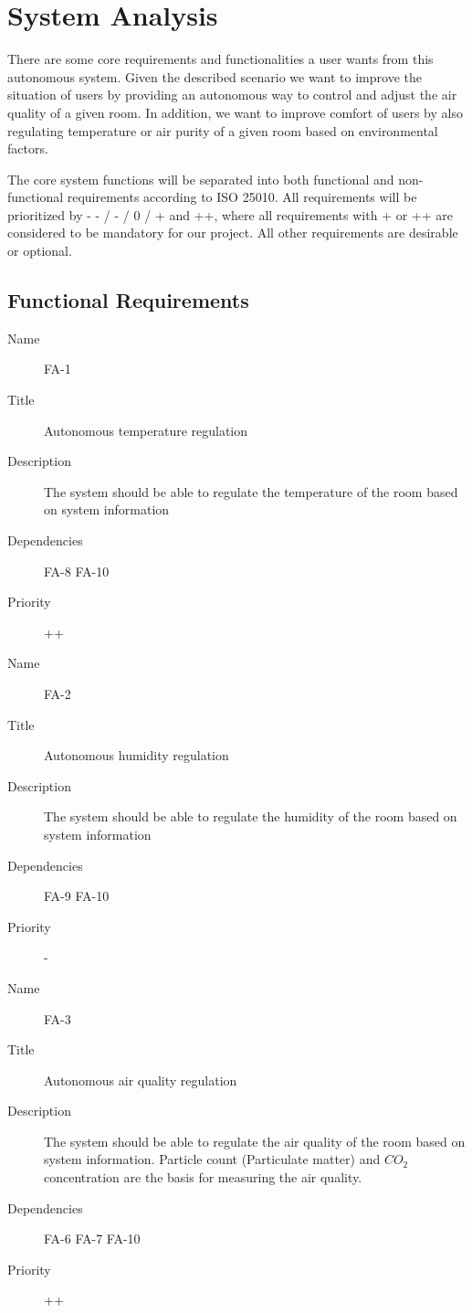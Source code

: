 
\section{System Analysis}\label{sec:system-analysis}

There are some core requirements and functionalities a user wants from this autonomous system.
Given the described scenario we want to improve the situation of users by providing an autonomous way to control and adjust the air quality of a given room.
In addition, we want to improve comfort of users by also regulating temperature or air purity of a given room based on environmental factors.

The core system functions will be separated into both functional and non-functional requirements according to ISO 25010.
All requirements will be prioritized by - - / - / 0 / + and ++, where all requirements with + or ++ are considered to be mandatory for our project.
All other requirements are desirable or optional.

\subsection{Functional Requirements}\label{subsec:functional-requirements}

\begin{description}
    \item[Name] FA-1
    \item[Title] Autonomous temperature regulation
    \item[Description] The system should be able to regulate the temperature of the room based on system information
    \item[Dependencies] FA-8 FA-10
    \item[Priority] ++
\end{description}

\begin{description}
    \item[Name] FA-2
    \item[Title] Autonomous humidity regulation
    \item[Description] The system should be able to regulate the humidity of the room based on system information
    \item[Dependencies] FA-9 FA-10
    \item[Priority] -
\end{description}

\begin{description}
    \item[Name] FA-3
    \item[Title] Autonomous air quality regulation
    \item[Description] The system should be able to regulate the air quality of the room based on system information. Particle count (Particulate matter) and $CO_2$ concentration are the basis for measuring the air quality.
    \item[Dependencies] FA-6 FA-7 FA-10
    \item[Priority] ++
\end{description}


